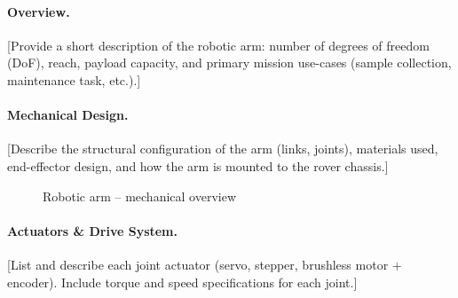 %

\paragraph{Overview.}
[Provide a short description of the robotic arm: number of degrees of freedom
(DoF), reach, payload capacity, and primary mission use-cases (sample
collection, maintenance task, etc.).]

\paragraph{Mechanical Design.}
[Describe the structural configuration of the arm (links, joints), materials
used, end-effector design, and how the arm is mounted to the rover chassis.]

\begin{figure}[H]
    \centering
    \caption{Robotic arm -- mechanical overview}
    \label{fig:arm_mech}
\end{figure}

\paragraph{Actuators \& Drive System.}
[List and describe each joint actuator (servo, stepper, brushless motor + encoder).
Include torque and speed specifications for each joint.]

